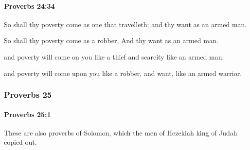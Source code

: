 		\paragraph{Proverbs 24:34} %
			\label{PROVERBS-24-34}

			So shall thy poverty come as one that travelleth; and thy want as an armed man.

			\begin{versebox}
					\item[BHS] 
					\item[ASV] So shall thy poverty come as a robber, And thy want as an armed man.
					\item[NIV] and poverty will come on you like a thief and scarcity like an armed man.
					\item[NRSV] and poverty will come upon you like a robber, and want, like an armed warrior.
			\end{versebox}
	\subsubsection{Proverbs 25} %
		\label{PROVERBS-25}

		\paragraph{Proverbs 25:1} %
			\label{PROVERBS-25-1}

			These are also proverbs of Solomon, which the men of Hezekiah king of Judah copied out.

